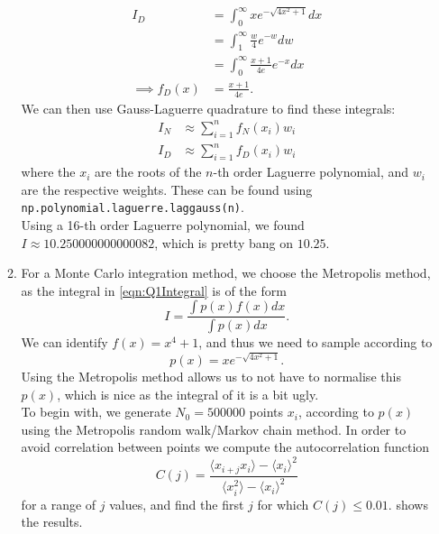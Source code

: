 \documentclass[11pt]{article}
\begin{document}
\begin{enumerate}
\begin{enumerate}
        \begin{align}
            I_D &= \int_0^\infty xe^{-\sqrt{4x^2 +1}}dx \nonumber\\
            &=\int_1^\infty \frac{w}{4}e^{-w} dw \nonumber\\
            &=\int_0^\infty \frac{x+1}{4e}e^{-x} dx \label{eqn:q1iDenominator}\\
            \implies f_D(x) &= \frac{x+1}{4e}. \label{eqn:q1iFD}
        \end{align}
        We can then use Gauss-Laguerre quadrature to find these integrals:
        \begin{align}
            I_N &\approx \sum_{i=1}^n f_N(x_i)w_i \label{eqn:GLNumerator}\\
            I_D &\approx \sum_{i=1}^n f_D(x_i)w_i \label{eqn:GLDenominator}
        \end{align}
        where the $x_i$ are the roots of the $n$-th order Laguerre polynomial, and $w_i$ are the respective weights. These can be found using \texttt{np.polynomial.laguerre.laggauss(n)}.\\
        Using a 16-th order Laguerre polynomial, we found $I \approx 10.250000000000082$, which is pretty bang on $10.25$.

        \item For a Monte Carlo integration method, we choose the Metropolis method, as the integral in \cref{eqn:Q1Integral} is of the form
        \begin{equation}
            I = \frac{\int p(x)f(x)dx}{\int p(x)dx}.
            \label{eqn:MetropolisGeneralForm}
        \end{equation}
        We can identify $f(x)=x^4+1$, and thus we need to sample according to 
        \begin{equation}
            p(x) = xe^{-\sqrt{4x^2 +1}}.
            \label{eqn:q1iiProbDist}
        \end{equation}
        Using the Metropolis method allows us to not have to normalise this $p(x)$, which is nice as the integral of it is a bit ugly.\\
        To begin with, we generate $N_0=\num[]{500000}$ points $x_i$, according to $p(x)$ using the Metropolis random walk/Markov chain method. In order to avoid correlation between points we compute the autocorrelation function 
        \begin{equation}
            C(j) = \frac{\langle x_{i+j}x_i\rangle - \langle x_i \rangle^2}{\langle x_i^2 \rangle - \langle x_i \rangle^2}
            \label{eqn:Autocorrelation}
        \end{equation}
        for a range of $j$ values, and find the first $j$ for which $C(j)\leq 0.01$.  shows the results.


\end{enumerate}
\end{enumerate}
\end{document}
